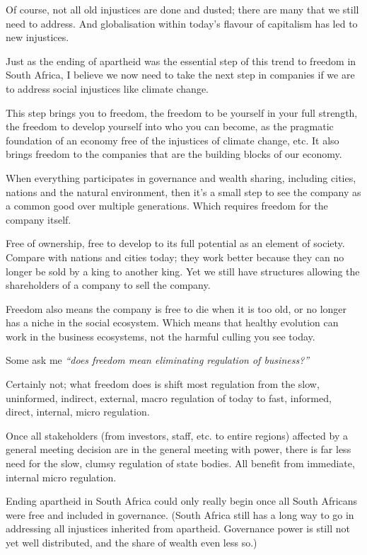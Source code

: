 Of course, not all old injustices are done and dusted; there are many that we still need to address. And globalisation within today's flavour of capitalism has led to new injustices. 


Just as the ending of apartheid was the essential step of this trend to freedom in South Africa, I believe we now need to take the next step in companies if we are to address social injustices like climate change.


This step brings you to freedom, the freedom to be yourself in your full strength, the freedom to develop yourself into who you can become\cite{sen-development}, as the pragmatic foundation of an economy free of the injustices of climate change, etc. It also brings freedom to the companies that are the building blocks of our economy.


When everything participates in governance and wealth sharing, including cities, nations and the natural environment, then it’s a small step to see the company as a common good over multiple generations. Which requires freedom for the company itself. 


Free of ownership, free to develop to its full potential as an element of society. Compare with nations and cities today; they work better because they can no longer be sold by a king to another king. Yet we still have structures allowing the shareholders of a company to sell the company.


Freedom also means the company is free to die when it is too old, or no longer has a niche in the social ecosystem. Which means that healthy evolution can work in the business ecosystems, not the harmful culling you see today.


Some ask me \emph{“does freedom mean eliminating regulation of business?”} 


Certainly not; what freedom does is shift most regulation from the slow, uninformed, indirect, external, macro regulation of today to fast, informed, direct, internal, micro regulation. 


Once all stakeholders (from investors, staff, etc. to entire regions) affected by a general meeting decision are in the general meeting with power, there is far less need for the slow, clumsy regulation of state bodies. All benefit from immediate, internal micro regulation.


Ending apartheid in South Africa could only really begin once all South Africans were free and included in governance. (South Africa still has a long way to go in addressing all injustices inherited from apartheid. Governance power is still not yet well distributed, and the share of wealth even less so.)


